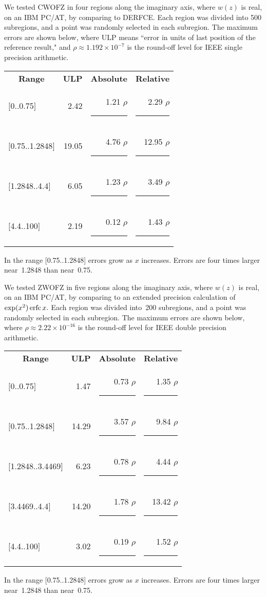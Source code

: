 \documentclass[twoside]{MATH77}
\begin{document}
We tested CWOFZ in four regions along the imaginary axis, where $w(z)$ is
real, on an IBM PC/AT, by comparing to DERFCE. Each region was divided into
500 subregions, and a point was randomly selected in each subregion. The
maximum errors are shown below, where ULP means ``error in units of last
position of the reference result," and $\rho \approx 1.192\times 10^{- 7}$ is the
round-off level for IEEE single precision arithmetic.\vspace{-5pt}
\begin{center}
\begin{tabular}{lrrr}
\multicolumn{1}{c}{\bf Range} & {\bf ULP} &
\multicolumn{1}{c}{\bf Absolute} & \multicolumn{1}{c}{\bf Relative}\\
$[$0..0.75$]$ & 2.42 & 1.21 $\rho $\rule{.1in}{0pt} & 2.29 $\rho $\rule{.05in}{0pt}\\
$[$0.75..1.2848$]$ & 19.05 & 4.76 $\rho $\rule{.1in}{0pt} & 12.95 $\rho $\rule{.05in}{0pt}\\
$[$1.2848..4.4$]$ & 6.05 & 1.23 $\rho $\rule{.1in}{0pt} & 3.49 $\rho $\rule{.05in}{0pt}\\
$[$4.4..100$]$ & 2.19 & 0.12 $\rho $\rule{.1in}{0pt} & 1.43 $\rho $\rule{.05in}{0pt}
\end{tabular}
\end{center}\vspace{-5pt}
In the range [0.75..1.2848] errors grow as $x$ increases. Errors are four
times larger near~1.2848 than near~0.75.

We tested ZWOFZ in five regions along the imaginary axis, where $w(z)$ is
real, on an IBM PC/AT, by comparing to an extended precision calculation of $%
\exp (x^2) \erfc x.$ Each region was divided into~200 subregions, and a
point was randomly selected in each subregion. The maximum errors are shown
below, where $\rho \approx 2.22\times 10^{-16}$ is the round-off level for IEEE
double precision arithmetic.\vspace{-5pt}
\begin{center}
\begin{tabular}{lrrr}
\multicolumn{1}{c}{\bf Range} & {\bf ULP} &
\multicolumn{1}{c}{\bf Absolute} & \multicolumn{1}{c}{\bf Relative}\\
$[$0..0.75$]$ & 1.47 & 0.73 $\rho $\rule{.1in}{0pt} & 1.35 $\rho $\rule{.05in}{0pt}\\
$[$0.75..1.2848$]$ & 14.29 & 3.57 $\rho $\rule{.1in}{0pt} & 9.84 $\rho $\rule{.05in}{0pt}\\
$[$1.2848..3.4469$]$ & 6.23 & 0.78 $\rho $\rule{.1in}{0pt} & 4.44 $\rho $\rule{.05in}{0pt}\\
$[$3.4469..4.4$]$ & 14.20 & 1.78 $\rho $\rule{.1in}{0pt} & 13.42 $\rho $\rule{.05in}{0pt}\\
$[$4.4..100$]$ & 3.02 & 0.19 $\rho $\rule{.1in}{0pt} & 1.52 $\rho $\rule{.05in}{0pt}
\end{tabular}
\end{center}\vspace{-5pt}
In the range [0.75..1.2848] errors grow as $x$ increases. Errors are four
times larger near~1.2848 than near~0.75.
\end{document}
